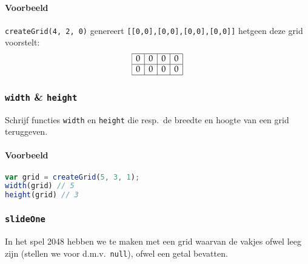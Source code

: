 \documentclass{khlexamen}
\begin{document}
\paragraph{Voorbeeld}
{\tt createGrid(4, 2, 0)} genereert {\tt [[0,0],[0,0],[0,0],[0,0]]}
hetgeen deze grid voorstelt:
\[
\begin{array}{|c|c|c|c|}
  \hline
    0 & 0 & 0 & 0 \\
  \hline
    0 & 0 & 0 & 0 \\
  \hline
\end{array}
\]

\vskip4mm
\answerlines[12]

\clearpage
\subsubsection{{\tt width} \& {\tt height}}
Schrijf functies {\tt width} en {\tt height} die resp.\ de breedte en hoogte van een grid teruggeven.

\paragraph{Voorbeeld}
\begin{center}
\begin{minipage}{.8\linewidth}
\begin{lstlisting}[language=javascript]
var grid = createGrid(5, 3, 1);
width(grid) // 5
height(grid) // 3
\end{lstlisting}
\end{minipage}
\end{center}

\vskip4mm
\answerlines[17]

\clearpage
\SMALLHEADER
\subsubsection{{\tt slideOne}}
In het spel 2048 hebben we te maken met een grid waarvan de vakjes
ofwel leeg zijn (stellen we voor d.m.v.\ {\tt null}), ofwel een getal bevatten.

\begin{center}
\end{center}
\end{document}
